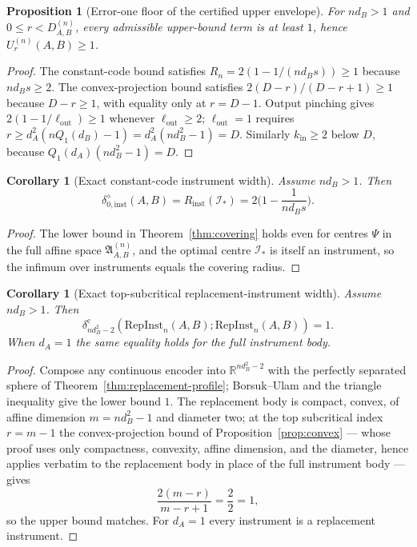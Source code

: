 \documentclass[11pt,a4paper]{article}
\newtheorem{proposition}[theorem]{Proposition}
\newtheorem{corollary}[theorem]{Corollary}
\newcommand{\RepInst}{\mathrm{RepInst}}
\begin{document}
\begin{proposition}[Error-one floor of the certified upper envelope]
\label{prop:floor}
For $nd_B>1$ and $0\le r<D_{A,B}^{(n)}$, every admissible upper-bound term is at least $1$, hence $U_r^{(n)}(A,B)\ge1$.
\end{proposition}

\begin{proof}
The constant-code bound satisfies $R_n=2(1-1/(nd_Bs))\ge1$ because $nd_Bs\ge2$. The convex-projection bound satisfies $2(D-r)/(D-r+1)\ge1$ because $D-r\ge1$, with equality only at $r=D-1$. Output pinching gives $2(1-1/\ell_{\mathrm{out}})\ge1$ whenever $\ell_{\mathrm{out}}\ge2$; $\ell_{\mathrm{out}}=1$ requires $r\ge d_A^2(nQ_1(d_B)-1)=d_A^2(nd_B^2-1)=D$. Similarly $k_{\mathrm{in}}\ge2$ below $D$, because $Q_1(d_A)(nd_B^2-1)=D$.
\end{proof}

\begin{corollary}[Exact constant-code instrument width]
\label{cor:constant-code}
Assume $nd_B>1$. Then
\[
\delta_{0,\mathrm{inst}}^{\diamond}(A,B)=R_{\mathrm{inst}}(\mathcal I_*)=2\Big(1-\frac1{nd_Bs}\Big).
\]
\end{corollary}

\begin{proof}
The lower bound in Theorem~\ref{thm:covering} holds even for centres $\Psi$ in the full affine space $\mathfrak A_{A,B}^{(n)}$, and the optimal centre $\mathcal I_*$ is itself an instrument, so the infimum over instruments equals the covering radius.
\end{proof}

\begin{corollary}[Exact top-subcritical replacement-instrument width]
\label{cor:top-subcritical}
Assume $nd_B>1$. Then
\[
\delta_{nd_B^2-2}^{\mathrm c}(\RepInst_n(A,B);\RepInst_n(A,B))=1.
\]
When $d_A=1$ the same equality holds for the full instrument body.
\end{corollary}

\begin{proof}
Compose any continuous encoder into $\mathbb R^{nd_B^2-2}$ with the perfectly separated sphere of Theorem~\ref{thm:replacement-profile}; Borsuk--Ulam and the triangle inequality give the lower bound $1$. The replacement body is compact, convex, of affine dimension $m=nd_B^2-1$ and diameter two; at the top subcritical index $r=m-1$ the convex-projection bound of Proposition~\ref{prop:convex} --- whose proof uses only compactness, convexity, affine dimension, and the diameter, hence applies verbatim to the replacement body in place of the full instrument body --- gives
\[
\frac{2(m-r)}{m-r+1}=\frac{2}{2}=1,
\]
so the upper bound matches. For $d_A=1$ every instrument is a replacement instrument.
\end{proof}
\end{document}

